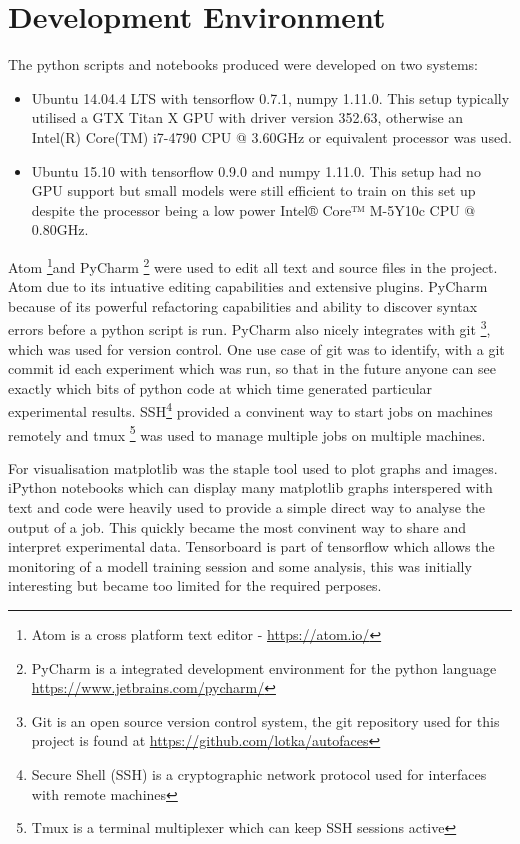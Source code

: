   \section{Development Environment}
    The python scripts and notebooks produced were developed on two systems:
    \begin{itemize}
      \item     Ubuntu 14.04.4 LTS with tensorflow 0.7.1, numpy 1.11.0. This setup typically utilised a GTX Titan X GPU with driver version 352.63, otherwise
                an Intel(R) Core(TM) i7-4790 CPU @ 3.60GHz or equivalent processor was used.
      \item     Ubuntu 15.10 with tensorflow 0.9.0 and numpy 1.11.0. This setup had no GPU support but small models were still efficient to train on this set up
                despite the processor being a low power Intel® Core™ M-5Y10c CPU @ 0.80GHz.
    \end{itemize}
    Atom \footnote{Atom is a cross platform text editor - \url{https://atom.io/}}and PyCharm \footnote{PyCharm is a integrated development environment for the python language \url{https://www.jetbrains.com/pycharm/}} were used to edit all text and source files in the project.
    Atom due to its intuative editing capabilities and extensive plugins. PyCharm because
    of its powerful refactoring capabilities and ability to discover syntax errors before
    a python script is run. PyCharm also nicely integrates with git \footnote{Git is an open source version control system,
    the git repository used for this project is found at \url{https://github.com/lotka/autofaces}}, which was used for version control.
    One use case of git was to identify, with a git commit id each experiment which was run, so that in the future
    anyone can see exactly which bits of python code at which time generated particular experimental results.
    SSH\footnote{Secure Shell (SSH) is a cryptographic network protocol used for interfaces with remote machines} provided a convinent way to start jobs on machines remotely and tmux \footnote{Tmux is a terminal
    multiplexer which can keep SSH sessions active} was used to manage multiple jobs on multiple machines.

    For visualisation matplotlib was the staple tool used to plot graphs and images. iPython notebooks
    which can display many matplotlib graphs interspered with text and code were heavily used to
    provide a simple direct way to analyse the output of a job. This quickly became the most convinent way to
    share and interpret experimental data. Tensorboard is part of tensorflow which allows the monitoring of a
    modell training session and some analysis, this was initially interesting but became too limited for the required perposes.
